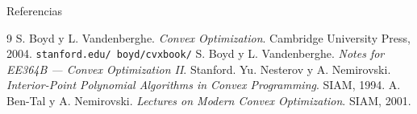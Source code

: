 \documentclass[10pt,aspectratio=169]{beamer}
\newcommand{\0}{\mathbf{0}}
\begin{document}
\begin{frame}{Referencias}
  \begin{thebibliography}{9}
     S. Boyd y L. Vandenberghe.
      \emph{Convex Optimization}. Cambridge University Press, 2004.
      \texttt{stanford.edu/~boyd/cvxbook/}
     S. Boyd y L. Vandenberghe.
      \emph{Notes for EE364B --- Convex Optimization II}. Stanford.
     Yu. Nesterov y A. Nemirovski.
      \emph{Interior-Point Polynomial Algorithms in Convex Programming}. SIAM, 1994.
     A. Ben-Tal y A. Nemirovski.
      \emph{Lectures on Modern Convex Optimization}. SIAM, 2001.
  \end{thebibliography}
\end{frame}
\end{document}

